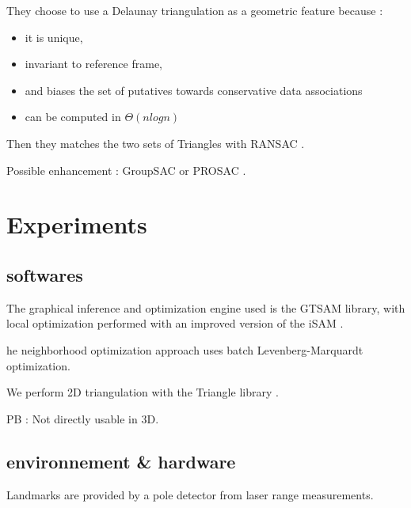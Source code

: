 \documentclass[twoside,twocolumn]{article}
\begin{document}
They choose to use a Delaunay triangulation as a geometric
feature  because  :
\begin{itemize}
  \item it  is  unique,
  \item invariant  to  reference  frame,
  \item and  biases  the  set  of  putatives  towards  conservative  data
  associations
  \item can be computed in $\Theta
(
n
log
n
)$
\end{itemize}
Then they matches the two sets of Triangles with RANSAC \cite{fischler_random_1981}.

Possible enhancement : GroupSAC \cite{ni_groupsac:_2009} or PROSAC \cite{chum_matching_2005}.

\section{Experiments}
\subsection{softwares}

The  graphical  inference  and  optimization
engine  used  is  the  GTSAM  library,  with  local  optimization
performed  with  an  improved  version  of  the  iSAM \cite{kaess_isam:_2008}.

he  neighborhood  optimization  approach  uses
batch  Levenberg-Marquardt  optimization.

We  perform  2D
triangulation with the Triangle library \cite{shewchuk_triangle:_1996}.

PB : Not directly usable in 3D.

\subsection{environnement & hardware}
Landmarks are provided by a pole detector from laser range measurements.

\printbibliography
\end{document}
